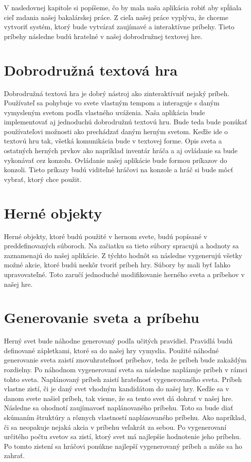 V nasledovnej kapitole si popíšeme, čo by mala naša aplikácia robiť aby spĺňala cieľ zadania našej bakalárskej práce. Z cieľa našej práce vyplýva, že chceme vytvoriť systém, ktorý bude vytvárať zaujímavé a interaktívne príbehy. Tieto príbehy následne budú hratelné v našej dobrodružnej textovej hre.\par
\section{Dobrodružná textová hra}
Dobrodružná textová hra je dobrý nástroj ako zinteraktívniť nejaký príbeh. Používateľ sa pohybuje vo svete vlastným tempom a interaguje s daným vymysleným svetom podľa vlastného uváženia. Naša aplikácia bude implementovať aj jednoduchú dobrodružnú textovú hru. Bude teda bude ponúkať používateľovi možnosti ako prechádzať daným herným svetom. Keďže ide o textovú hru tak, všetká komunikácia bude v textovej forme. Opis sveta a ostatných herných prvkov ako napríklad inventár hráča a aj ovládanie sa bude vykonávať cez konzolu. Ovládanie našej aplikácie bude formou príkazov do konzoli. Tieto príkazy budú viditeľné hráčovi na konzole a hráč si bude môcť vybrať, ktorý chce použit.\par
\section{Herné objekty}
Herné objekty, ktoré budú použité v hernom svete, budú popísané v preddefinovaných súboroch. Na začiatku sa tieto súbory spracujú a hodnoty sa zaznamenajú do našej aplikácie. Z týchto hodnôt sa následne vygenerujú všetky možné akcie, ktoré budú neskôr tvoriť príbeh hry. Súbory by mali byť ľahko upravovateľné. Toto zaručí jednoduché modifikovanie herného sveta a príbehov v našej hre.\par
\section{Generovanie sveta a príbehu}
Herný svet bude náhodne generovaný podľa učitých pravidiel. Pravidlá budú definované zápletkami, ktoré sa do našej hry vymyslia. Použité náhodné generovanie sveta zaistí znovuhrateľnosť príbehov, teda že príbeh bude zakaždým rozdielny. Po náhodnom vygenerovaní sveta sa následne naplánuje príbeh v rámci tohto sveta. Naplánovaný príbeh zaistí hrateľnosť vygenerovaného sveta. Príbeh vlastne zistí, či je daný svet vhodným kandidátom do našej hry. Keďže sa v danom svete našiel príbeh, tak vieme, že sa tento svet dá dohrať v našej hre. Následne sa ohodnotí zaujímavosť naplánovaného príbehu. Toto sa bude diať skúmaním štruktúry a rôznych vlastností naplánovaného príbehu. Ako napríklad, či sa neopakuje nejaká akcia v príbehu veľakrát za sebou. Po vygenerovaní určitého počtu svetov sa zistí, ktorý svet má najlepšie hodnotenie jeho príbehu. Po tomto zistení sa hráčovi ponúkne najlepší vygenerovaný príbeh a môže sa ho zahrať.\par
